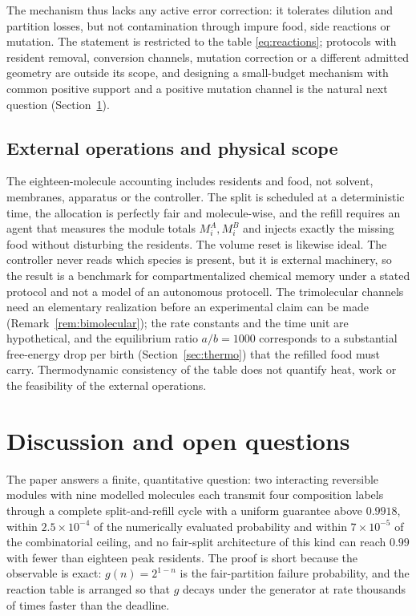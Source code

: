 \documentclass[11pt,a4paper]{article}
\theoremstyle{plain}
\theoremstyle{definition}
\theoremstyle{remark}
\begin{document}
The mechanism thus lacks any active error correction: it tolerates dilution and partition losses, but not contamination through impure food, side reactions or mutation. The statement is restricted to the table \eqref{eq:reactions}; protocols with resident removal, conversion channels, mutation correction or a different admitted geometry are outside its scope, and designing a small-budget mechanism with common positive support and a positive mutation channel is the natural next question (Section~\ref{sec:discussion}).

\subsection{External operations and physical scope}
The eighteen-molecule accounting includes residents and food, not solvent, membranes, apparatus or the controller. The split is scheduled at a deterministic time, the allocation is perfectly fair and molecule-wise, and the refill requires an agent that measures the module totals $M_i^A,M_i^B$ and injects exactly the missing food without disturbing the residents. The volume reset is likewise ideal. The controller never reads which species is present, but it is external machinery, so the result is a benchmark for compartmentalized chemical memory under a stated protocol and not a model of an autonomous protocell. The trimolecular channels need an elementary realization before an experimental claim can be made (Remark~\ref{rem:bimolecular}); the rate constants and the time unit are hypothetical, and the equilibrium ratio $a/b=1000$ corresponds to a substantial free-energy drop per birth (Section~\ref{sec:thermo}) that the refilled food must carry. Thermodynamic consistency of the table does not quantify heat, work or the feasibility of the external operations.

\section{Discussion and open questions}\label{sec:discussion}
The paper answers a finite, quantitative question: two interacting reversible modules with nine modelled molecules each transmit four composition labels through a complete split-and-refill cycle with a uniform guarantee above $0.9918$, within $2.5\times10^{-4}$ of the numerically evaluated probability and within $7\times10^{-5}$ of the combinatorial ceiling, and no fair-split architecture of this kind can reach $0.99$ with fewer than eighteen peak residents. The proof is short because the observable is exact: $g(n)=2^{1-n}$ is the fair-partition failure probability, and the reaction table is arranged so that $g$ decays under the generator at rate thousands of times faster than the deadline.
\end{document}
